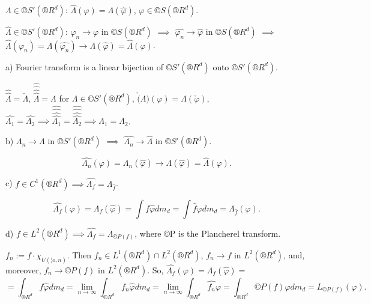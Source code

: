 \documentclass[12pt]{article}					%
\begin{document}
\begin{definice}
	$Λ \in ©S'(®R^d)$: $\hat{Λ}(φ) = Λ(\hat{φ})$, $φ \in ©S(®R^d)$.

	\begin{poznamkain}
		$\hat{Λ} \in ©S'(®R^d)$: $φ_n \rightarrow φ$ in $©S(®R^d)$ $\implies$ $\hat{φ_n} \rightarrow \hat{φ}$ in $©S(®R^d)$ $\implies$ $\hat{Λ}(φ_n) = Λ(\hat{φ_n}) \rightarrow Λ(\hat{φ}) = \hat{Λ}(φ)$.
	\end{poznamkain}
\end{definice}

\begin{veta}
	a) Fourier transform is a linear bijection of $©S'(®R^d)$ onto $©S'(®R^d)$.

	\begin{dukazin}
		$\hat{\hat{Λ}} = \check Λ$, $\hat{\hat{\hat{\hat{Λ}}}} = Λ$ for $Λ \in ©S'(®R^d)$, $\check(Λ)(φ) = Λ(\check φ)$, $\hat{Λ_1} = \hat{Λ_2} \implies \hat{\hat{\hat{\hat{Λ_1}}}} = \hat{\hat{\hat{\hat{Λ_2}}}} \implies Λ_1 = Λ_2$.
	\end{dukazin}


	b) $Λ_n \rightarrow Λ$ in $©S'(®R^d)$ $\implies$ $\hat{Λ_n} \rightarrow \hat{Λ}$ in $©S'(®R^d)$.

	\begin{dukazin}
		$$ \hat{Λ_n}(φ) = Λ_n(\hat{φ}) \rightarrow Λ(\hat{φ}) = \hat{Λ}(φ). $$
	\end{dukazin}

	c) $f \in C^1(®R^d) \implies \hat{Λ_f} = Λ_{\hat{f}}$.

	\begin{dukazin}
		$$ \hat{Λ_f}(φ) = Λ_f(\hat{φ}) = \int f \hat{φ} d m_d = \int \hat{f} φ d m_d = Λ_{\hat{f}}(φ). $$
	\end{dukazin}

	d) $f \in L^2(®R^d) \implies \hat{Λ_f} = Λ_{©P(f)}$, where ©P is the Plancherel transform.

	\begin{dukazin}
		$f_n := f·χ_{U(¦o, n)}$. Then $f_n \in L^1(®R^d) \cap L^2(®R^d)$, $f_n \rightarrow f$ in $L^2(®R^d)$, and, moreover, $\hat{f_n} \rightarrow ©P(f)$ in $L^2(®R^d)$. So, $\hat{Λ_f}(φ) = Λ_f (\hat{φ}) =$
		$$ = \int_{®R^d} f \hat{φ} d m_d = \lim_{n \rightarrow ∞} \int_{®R^d} f_n \hat{φ} d m_d = \lim_{n \rightarrow ∞} \int_{®R^d} \hat{f_n} φ = \int_{®R^d} ©P(f) φ d m_d = L_{©P(f)}(φ). $$
	\end{dukazin}


\end{veta}
\end{document}
